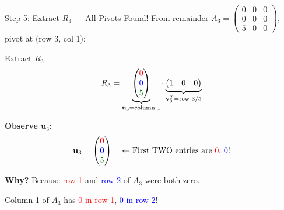 \documentclass[10pt]{beamer}
\theoremstyle{definition}
\newcommand{\x}[1]{\alert{\textbf{#1}}}
\begin{document}
\begin{frame}[fragile]{Step 5: Extract \textcolor{green!50!black}{$R_3$} — All Pivots Found!}
From remainder $A_3 = \begin{pmatrix} 0 & 0 & 0 \\ 0 & 0 & 0 \\ 5 & 0 & 0 \end{pmatrix}$, pivot at \textcolor{green!50!black}{(row 3, col 1)}:

\vfill
Extract \textcolor{green!50!black}{$R_3$}:
$$R_3 = \underbrace{\begin{pmatrix} \textcolor{red}{0} \\ \textcolor{blue}{0} \\ \textcolor{green!50!black}{5} \end{pmatrix}}_{\mathbf{u}_3 = \text{column 1}} \cdot \underbrace{\begin{pmatrix} 1 & 0 & 0 \end{pmatrix}}_{\mathbf{v}_3^T = \text{row 3}/5}$$

\vfill
\x{Observe $\mathbf{u}_3$}:
$$\mathbf{u}_3 = \begin{pmatrix} \textcolor{red}{\mathbf{0}} \\ \textcolor{blue}{\mathbf{0}} \\ \textcolor{green!50!black}{5} \end{pmatrix} \quad \leftarrow \text{First TWO entries are \textcolor{red}{0}, \textcolor{blue}{0}!}$$

\vfill
\x{Why?} Because \textcolor{red}{row 1} and \textcolor{blue}{row 2} of $A_3$ were both zero.

Column 1 of $A_3$ has \textcolor{red}{0 in row 1}, \textcolor{blue}{0 in row 2}!
\end{frame}
\end{document}

